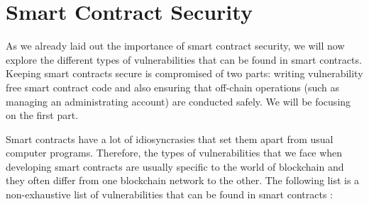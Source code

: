 \section{Smart Contract Security} \label{section:smart_contract_security}
As we already laid out the importance of smart contract security, we will now explore the different types of vulnerabilities that can be found in smart contracts.
Keeping smart contracts secure is compromised of two parts: writing vulnerability free smart contract code and also ensuring that off-chain operations (such as managing an administrating account) are conducted safely. We will be focusing on the first part.

Smart contracts have a lot of idiosyncrasies that set them apart from usual computer programs. Therefore, the types of vulnerabilities that we face when developing smart contracts are usually specific to the world of blockchain and they often differ from one blockchain network to the other. The following list is a non-exhaustive list of vulnerabilities that can be found in smart contracts \cite{he_smart_2020}:
